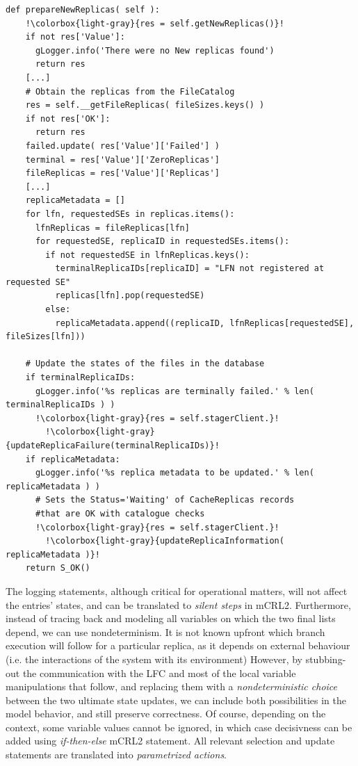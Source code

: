 \documentclass[10pt,conference]{IEEEtran}
\begin{document}
\begin{lstlisting}[float=tp,escapechar=!,basicstyle=\ttfamily\fontsize{7}{7}\selectfont]
  def prepareNewReplicas( self ):
    !\colorbox{light-gray}{res = self.getNewReplicas()}!
    if not res['Value']:
      gLogger.info('There were no New replicas found')
      return res
    [...]
    # Obtain the replicas from the FileCatalog
    res = self.__getFileReplicas( fileSizes.keys() )
    if not res['OK']:
      return res
    failed.update( res['Value']['Failed'] )
    terminal = res['Value']['ZeroReplicas']
    fileReplicas = res['Value']['Replicas']
    [...]
    replicaMetadata = []
    for lfn, requestedSEs in replicas.items():
      lfnReplicas = fileReplicas[lfn]
      for requestedSE, replicaID in requestedSEs.items():
        if not requestedSE in lfnReplicas.keys():
          terminalReplicaIDs[replicaID] = "LFN not registered at requested SE"
          replicas[lfn].pop(requestedSE)
        else:
          replicaMetadata.append((replicaID, lfnReplicas[requestedSE], fileSizes[lfn]))

    # Update the states of the files in the database
    if terminalReplicaIDs:
      gLogger.info('%s replicas are terminally failed.' % len( terminalReplicaIDs ) )
      !\colorbox{light-gray}{res = self.stagerClient.}!
	    !\colorbox{light-gray}{updateReplicaFailure(terminalReplicaIDs)}!
    if replicaMetadata:
      gLogger.info('%s replica metadata to be updated.' % len( replicaMetadata ) )
      # Sets the Status='Waiting' of CacheReplicas records 
      #that are OK with catalogue checks
      !\colorbox{light-gray}{res = self.stagerClient.}!
	    !\colorbox{light-gray}{updateReplicaInformation( replicaMetadata )}!
    return S_OK()

\end{lstlisting}

The logging statements, although critical for operational matters, will
not affect the entries' states, and can be translated to \textit{silent steps} in mCRL2.
Furthermore, instead of tracing back and modeling all variables on which 
the two final lists depend, we can use nondeterminism. 
It is not known upfront which branch execution will follow
for a particular replica, as it depends on external behaviour (i.e. the interactions of the system with its environment)
However, by stubbing-out the communication with the LFC and
most of the local variable manipulations 
that follow, and replacing them with a \textit{nondeterministic choice} between the two
ultimate state updates, we can include both possibilities in the model behavior,
and still preserve correctness. Of course, depending on the context, some 
variable values cannot be ignored, in which case decisivness can be added
using \textit{if-then-else} mCRL2 statement. All relevant selection and update 
statements are translated into \textit{parametrized actions}.
 
\end{document}
